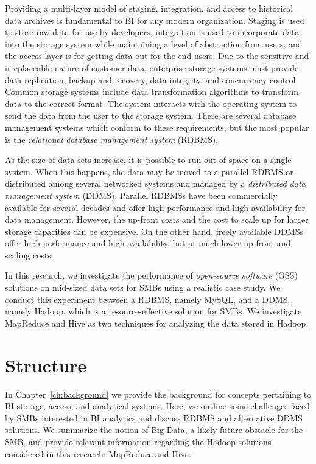Providing a multi-layer model of staging, integration, and access to historical data archives is fundamental to BI for any modern organization. Staging is used to store raw data for use by developers, integration is used to incorporate data into the storage system while maintaining a level of abstraction from users, and the access layer is for getting data out for the end users. Due to the sensitive and irreplaceable nature of customer data, enterprise storage systems must provide data replication, backup and recovery, data integrity, and concurrency control. Common storage systems include data transformation algorithms to transform data to the correct format. The system interacts with the operating system to send the data from the user to the storage system. There are several database management systems which conform to these requirements, but the most popular is the \textit{relational database management system} (RDBMS). 

As the size of data sets increase, it is possible to run out of space on a single system. When this happens, the data may be moved to a parallel RDBMS or distributed among several networked systems and managed by a \textit{distributed data management system} (DDMS). Parallel RDBMSs have been commercially available for several decades and offer high performance and high availability for data management. However, the up-front costs and the cost to scale up for larger storage capacities can be expensive. On the other hand, freely available DDMSs offer high performance and high availability, but at much lower up-front and scaling costs.  

In this research, we investigate the performance of \textit{open-source software} (OSS) solutions on mid-sized data sets for SMBs using a realistic case study. We conduct this experiment between a RDBMS, namely MySQL, and a DDMS, namely Hadoop, which is a resource-effective solution for SMBs. We investigate MapReduce and Hive as two techniques for analyzing the data stored in Hadoop.

\section{Structure}
In Chapter~\ref{ch:background} we provide the background for concepts pertaining to BI storage, access, and analytical systems. Here, we outline some challenges faced by SMBs interested in BI analytics and discuss RDBMS and alternative DDMS solutions. We summarize the notion of Big Data, a likely future obstacle for the SMB, and provide relevant information regarding the Hadoop solutions considered in this research: MapReduce and Hive.

